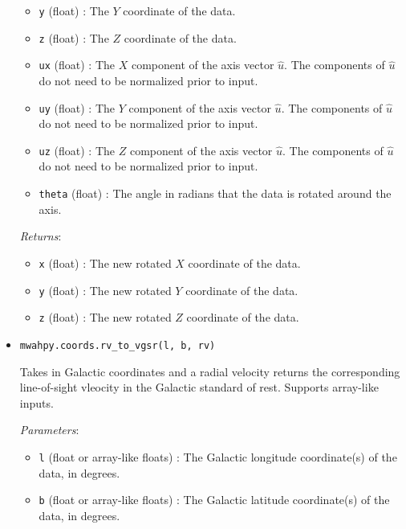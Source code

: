 \documentclass{article}
\begin{document}
\begin{itemize}
\begin{itemize}
\item \verb!y! (float) : The $Y$ coordinate of the data.

\item \verb!z! (float) : The $Z$ coordinate of the data.

\item \verb!ux! (float) : The $X$ component of the axis vector $\hat{u}$. The components of $\hat{u}$ do not need to be normalized prior to input.

\item \verb!uy! (float) : The $Y$ component of the axis vector $\hat{u}$. The components of $\hat{u}$ do not need to be normalized prior to input.

\item \verb!uz! (float) : The $Z$ component of the axis vector $\hat{u}$. The components of $\hat{u}$ do not need to be normalized prior to input.

\item \verb!theta! (float) : The angle in radians that the data is rotated around the axis. 

\end{itemize}

\textit{Returns}: \begin{itemize}

\item \verb!x! (float) : The new rotated $X$ coordinate of the data.

\item \verb!y! (float) : The new rotated $Y$ coordinate of the data.

\item \verb!z! (float) : The new rotated $Z$ coordinate of the data.

\end{itemize}



\item \verb!mwahpy.coords.rv_to_vgsr(l, b, rv)!

Takes in Galactic coordinates and a radial velocity returns the corresponding line-of-sight vleocity in the Galactic standard of rest. Supports array-like inputs.

\textit{Parameters}: \begin{itemize}

\item \verb!l! (float or array-like floats) : The Galactic longitude coordinate(s) of the data, in degrees.

\item \verb!b! (float or array-like floats) : The Galactic latitude coordinate(s) of the data, in degrees.


\end{itemize}
\end{itemize}
\end{document}
